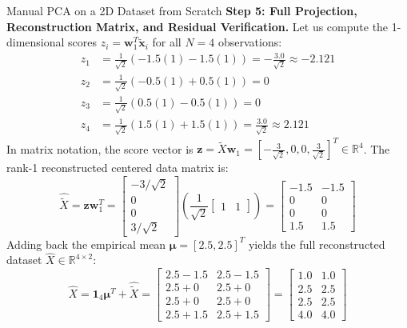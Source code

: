 \begin{examplebox}{Manual PCA on a 2D Dataset from Scratch}
\textbf{Step 5: Full Projection, Reconstruction Matrix, and Residual Verification.}
Let us compute the 1-dimensional scores $z_i = \mathbf{w}_1^T \tilde{\mathbf{x}}_i$ for all $N = 4$ observations:
\begin{align}
z_1 &= \frac{1}{\sqrt{2}} (-1.5(1) - 1.5(1)) = -\frac{3.0}{\sqrt{2}} \approx -2.121 \\
z_2 &= \frac{1}{\sqrt{2}} (-0.5(1) + 0.5(1)) = 0 \\
z_3 &= \frac{1}{\sqrt{2}} (0.5(1) - 0.5(1)) = 0 \\
z_4 &= \frac{1}{\sqrt{2}} (1.5(1) + 1.5(1)) = \frac{3.0}{\sqrt{2}} \approx 2.121
\end{align}
In matrix notation, the score vector is $\mathbf{z} = \tilde{X}\mathbf{w}_1 = \left[-\frac{3}{\sqrt{2}}, 0, 0, \frac{3}{\sqrt{2}}\right]^T \in \mathbb{R}^4$.
The rank-1 reconstructed centered data matrix is:
\begin{equation}
\hat{\tilde{X}} = \mathbf{z} \mathbf{w}_1^T = \begin{bmatrix} -3/\sqrt{2} \\ 0 \\ 0 \\ 3/\sqrt{2} \end{bmatrix} \left( \frac{1}{\sqrt{2}} \begin{bmatrix} 1 & 1 \end{bmatrix} \right) = \begin{bmatrix} -1.5 & -1.5 \\ 0 & 0 \\ 0 & 0 \\ 1.5 & 1.5 \end{bmatrix}
\end{equation}
Adding back the empirical mean $\boldsymbol{\mu} = [2.5, 2.5]^T$ yields the full reconstructed dataset $\hat{X} \in \mathbb{R}^{4 \times 2}$:
\begin{equation}
\hat{X} = \mathbf{1}_4 \boldsymbol{\mu}^T + \hat{\tilde{X}} = \begin{bmatrix} 2.5 - 1.5 & 2.5 - 1.5 \\ 2.5 + 0 & 2.5 + 0 \\ 2.5 + 0 & 2.5 + 0 \\ 2.5 + 1.5 & 2.5 + 1.5 \end{bmatrix} = \begin{bmatrix} 1.0 & 1.0 \\ 2.5 & 2.5 \\ 2.5 & 2.5 \\ 4.0 & 4.0 \end{bmatrix}

\end{equation}
\end{examplebox}
